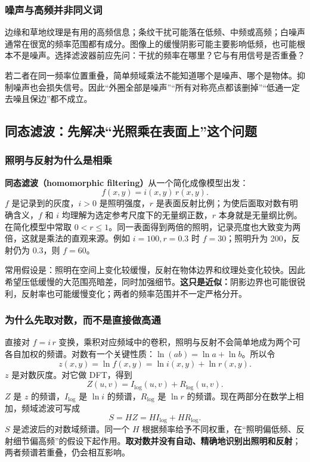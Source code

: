\subsubsection{噪声与高频并非同义词}
边缘和草地纹理是有用的高频信息；条纹干扰可能落在低频、中频或高频；白噪声通常在很宽的频率范围都有成分。图像上的缓慢阴影可能主要影响低频，也可能根本不是噪声。选择滤波器前应先问：干扰的频率在哪里？它与有用信号是否重叠？

若二者在同一频率位置重叠，简单频域乘法不能知道哪个是噪声、哪个是物体。抑制噪声也会损失信号。因此“外圈全部是噪声”“所有对称亮点都该删掉”“低通一定去噪且保边”都不成立。

\subsection{同态滤波：先解决“光照乘在表面上”这个问题}

\subsubsection{照明与反射为什么是相乘}
\textbf{同态滤波（homomorphic filtering）}从一个简化成像模型出发：
\[
f(x,y)=i(x,y)\,r(x,y).
\]
$f$ 是记录到的灰度，$i>0$ 是照明强度，$r$ 是表面反射比例；为使后面取对数有明确含义，$f$ 和 $i$ 均理解为选定参考尺度下的无量纲正数，$r$ 本身就是无量纲比例。在简化模型中常取 $0<r\leq1$。同一表面得到两倍的照明，记录亮度也大致变为两倍，这就是乘法的直观来源。例如 $i=100,r=0.3$ 时 $f=30$；照明升为 200，反射仍为 0.3，则 $f=60$。

常用假设是：照明在空间上变化较缓慢，反射在物体边界和纹理处变化较快。因此希望压低缓慢的大范围亮暗差，同时加强细节。\textbf{这只是近似：}阴影边界也可能很锐利，反射率也可能缓慢变化；两者的频率范围并不一定严格分开。

\subsubsection{为什么先取对数，而不是直接做高通}
直接对 $f=i\,r$ 变换，乘积对应频域中的卷积，照明与反射不会简单地成为两个可各自加权的频谱。对数有一个关键性质：$\ln(ab)=\ln a+\ln b$。所以令
\[
z(x,y)=\ln f(x,y)=\ln i(x,y)+\ln r(x,y).
\]
$z$ 是对数灰度。对它做 DFT，得到
\[
Z(u,v)=I_{\log}(u,v)+R_{\log}(u,v).
\]
$Z$ 是 $z$ 的频谱，$I_{\log}$ 是 $\ln i$ 的频谱，$R_{\log}$ 是 $\ln r$ 的频谱。现在两部分在数学上相加，频域滤波可写成
\[
S=HZ=H I_{\log}+H R_{\log}.
\]
$S$ 是滤波后的对数域频谱。同一个 $H$ 根据频率给予不同权重，在“照明偏低频、反射细节偏高频”的假设下起作用。\textbf{取对数并没有自动、精确地识别出照明和反射}；两者频谱若重叠，仍会相互影响。

